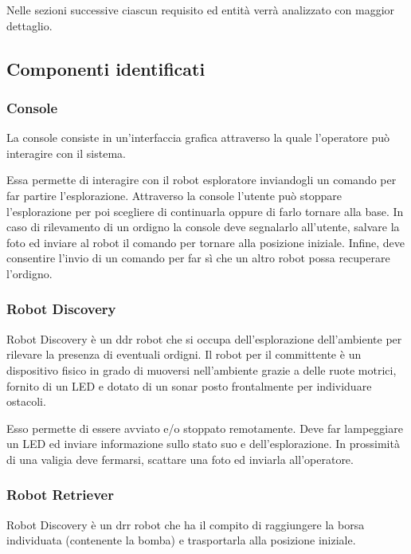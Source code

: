 Nelle sezioni successive ciascun requisito ed entità verrà analizzato con maggior dettaglio.

\subsection{Componenti identificati}

\subsubsection{Console}

La console consiste in un'interfaccia grafica attraverso la quale l'operatore può interagire con il sistema.

Essa permette di interagire con il robot esploratore inviandogli un comando per far partire l'esplorazione.
Attraverso la console l'utente può stoppare l'esplorazione per poi scegliere di continuarla oppure di farlo tornare alla base.
In caso di rilevamento di un ordigno la console deve segnalarlo all'utente, salvare la foto ed inviare al robot il comando per tornare alla posizione iniziale.
Infine, deve consentire l'invio di un comando per far sì che un altro robot possa recuperare l'ordigno.

\subsubsection{Robot Discovery}

Robot Discovery è un ddr robot che si occupa dell'esplorazione dell'ambiente per rilevare la presenza di eventuali ordigni.
Il robot per il committente è un dispositivo fisico in grado di muoversi nell'ambiente grazie a delle ruote motrici, fornito di un LED
e dotato di un sonar posto frontalmente per individuare ostacoli.

Esso permette di essere avviato e/o stoppato remotamente.
Deve far lampeggiare un LED ed inviare informazione sullo stato suo e dell'esplorazione.
In prossimità di una valigia deve fermarsi, scattare una foto ed inviarla all'operatore.

\subsubsection{Robot Retriever}

Robot Discovery è un drr robot che ha il compito di raggiungere la borsa individuata (contenente la bomba) e trasportarla alla posizione iniziale.

